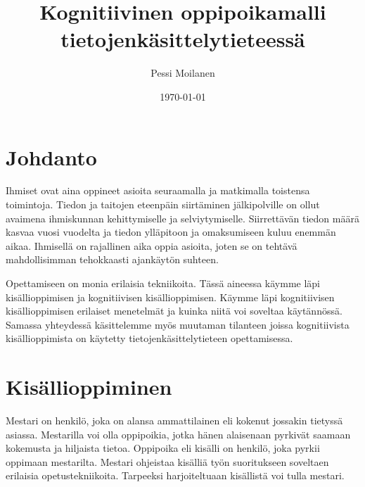 \documentclass[finnish]{tktltiki2}
\title{Kognitiivinen oppipoikamalli tietojenkäsittelytieteessä}
\author{Pessi Moilanen}
\date{\today}
\theoremstyle{definition}
\theoremstyle{remark}
\begin{document}

\frontmatter      %

\maketitle        %
\makeabstract     %

\tableofcontents  %


\mainmatter       %


\section{Johdanto}

Ihmiset ovat aina oppineet asioita seuraamalla ja matkimalla toistensa toimintoja. Tiedon ja taitojen eteenpäin siirtäminen jälkipolville on ollut avaimena ihmiskunnan kehittymiselle ja selviytymiselle. Siirrettävän tiedon määrä kasvaa vuosi vuodelta ja tiedon ylläpitoon ja omaksumiseen kuluu enemmän aikaa. Ihmisellä on rajallinen aika oppia asioita, joten se on tehtävä mahdollisimman tehokkaasti ajankäytön suhteen.

Opettamiseen on monia erilaisia tekniikoita. Tässä aineessa käymme läpi kisällioppimisen ja kognitiivisen kisällioppimisen. Käymme läpi kognitiivisen kisällioppimisen erilaiset menetelmät ja kuinka niitä voi soveltaa käytännössä. Samassa yhteydessä käsittelemme myös muutaman tilanteen joissa kognitiivista kisällioppimista on käytetty tietojenkäsittelytieteen opettamisessa.


\section{Kisällioppiminen}

Mestari on henkilö, joka on alansa ammattilainen eli kokenut jossakin tietyssä asiassa. Mestarilla voi olla oppipoikia, jotka hänen alaisenaan pyrkivät saamaan kokemusta ja hiljaista tietoa. Oppipoika eli kisälli on henkilö, joka pyrkii oppimaan mestarilta. Mestari ohjeistaa kisälliä työn suoritukseen soveltaen erilaisia opetustekniikoita. Tarpeeksi harjoiteltuaan kisällistä voi tulla mestari.
\end{document}
